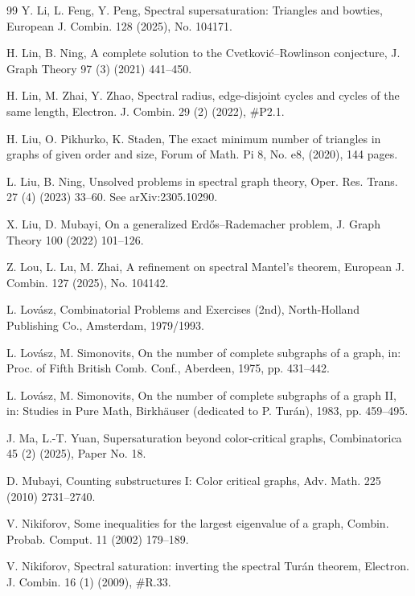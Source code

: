 \documentclass[11pt]{article}
\begin{document}
\begin{thebibliography}{99}
Y. Li, L. Feng, Y. Peng, 
Spectral supersaturation: Triangles and bowties, 
European J. Combin.  128 (2025), No. 104171. 

H. Lin,  B. Ning, 
A complete solution to the Cvetkovi\'{c}--Rowlinson conjecture, 
J. Graph Theory 97 (3) (2021) 441--450.  

H. Lin, M. Zhai, Y. Zhao, 
Spectral radius, edge-disjoint cycles and cycles of the same length, 
Electron. J. Combin. 29 (2) (2022), \#P2.1. 

H. Liu, O. Pikhurko, K. Staden, 
The exact minimum number of triangles in graphs of given order and size, 
Forum of Math. Pi 8, No. e8, (2020), 144 pages. 

L. Liu, B. Ning, 
Unsolved problems in spectral graph theory, 
Oper. Res. Trans. 27 (4) (2023) 33--60. 
See arXiv:2305.10290. 

X. Liu, D. Mubayi, 
On a generalized Erd\H{o}s--Rademacher problem, 
J. Graph Theory 100 (2022) 101--126. 

Z. Lou, L. Lu, M. Zhai, 
A refinement on spectral Mantel's theorem, 
European J. Combin. 127 (2025), No. 104142. 

L. Lov\'{a}sz, 
Combinatorial Problems and Exercises (2nd), 
North-Holland Publishing Co., Amsterdam, 1979/1993. 


L. Lov\'{a}sz, M. Simonovits,
On the number of complete subgraphs of a graph,
in: Proc. of Fifth British Comb. Conf., Aberdeen, 1975,
pp. 431--442.


L. Lov\'{a}sz, M. Simonovits,
On the number of complete subgraphs of a graph II,
in: Studies in Pure Math, Birkh\"{a}user (dedicated to P. Tur\'{a}n), 1983,
pp. 459--495. 

J. Ma, L.-T. Yuan, 
Supersaturation beyond color-critical graphs, 
Combinatorica 45 (2) (2025), Paper No. 18. 

D. Mubayi,
Counting substructures I: Color critical graphs,
Adv. Math. 225 (2010) 2731--2740.

V. Nikiforov, 
Some inequalities for the largest eigenvalue of a graph, 
Combin. Probab. Comput. 11 (2002) 179--189. 

V. Nikiforov, Spectral saturation: inverting the spectral Tur\'{a}n theorem,  Electron. J. Combin. 16 (1) (2009), \#R.33.  


\end{thebibliography}
\end{document}
